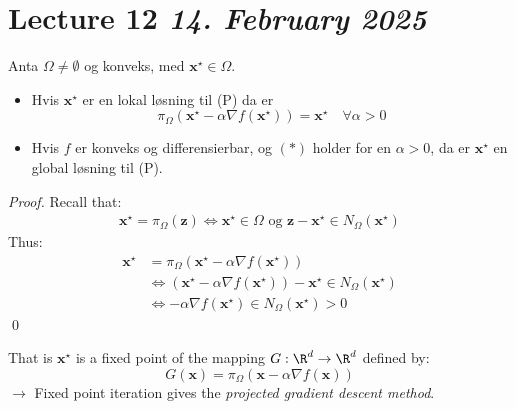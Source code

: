 \section{Lecture 12 \emph{14. February 2025}}

\begin{proposition}{}{}
	Anta \(\Omega \neq \emptyset\) og konveks, med \(\symbf{x}^\star \in \Omega\).
	\begin{itemize}
		\item Hvis \(\symbf{x}^\star\) er en lokal løsning til (P) da er
		      \[
			      \pi_{\Omega}(\symbf{x}^\star - \alpha \nabla f(\symbf{x}^\star)) = \symbf{x}^\star \quad \forall \alpha > 0 \tag{\(\ast\)}
		      \]
		\item Hvis \(f\) er konveks og differensierbar, og \((\ast)\) holder for en \(\alpha > 0\), da er \(\symbf{x}^\star\) en global løsning til (P).
	\end{itemize}
\end{proposition}

\begin{proof}
	Recall that:
	\begin{align*}
		\symbf{x}^\star = \pi_{\Omega}(\symbf{z}) \iff \symbf{x}^\star \in \Omega \text{ og } \symbf{z} - \symbf{x}^\star \in N_{\Omega}(\symbf{x}^\star)
	\end{align*}
	Thus:
	\begin{align*}
		\symbf{x}^\star & = \pi_{\Omega}(\symbf{x}^\star - \alpha \nabla f(\symbf{x}^\star))                                                     \\
		                & \iff \left(\symbf{x}^\star - \alpha \nabla f(\symbf{x}^\star)\right) - \symbf{x}^\star \in N_{\Omega}(\symbf{x}^\star) \\
		                & \iff -\alpha \nabla f(\symbf{x}^\star) \in N_{\Omega}(\symbf{x}^\star) > 0
	\end{align*}
	\qed
\end{proof}

That is \(\symbf{x}^\star\) is a fixed point of the mapping \(G: \R^d \to \R^d\) defined by:
\[
	G(\symbf{x}) = \pi_{\Omega}(\symbf{x} - \alpha \nabla f(\symbf{x}))
\]
\( \rightarrow \) Fixed point iteration gives the \emph{projected gradient descent method}.


